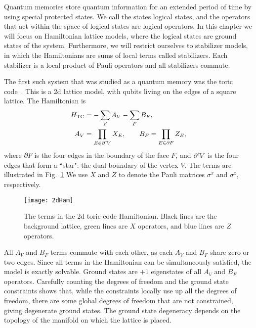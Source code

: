 Quantum memories store quantum information for an extended period of time by using special protected states. We call the states logical states, and the operators that act within the space of logical states are logical operators. 
In this chapter we will focus on Hamiltonian lattice models, where the logical states are ground states of the system. Furthermore, we will restrict ourselves to stabilizer models, in which the Hamiltonians are sums of local terms called stabilizers.
Each stabilizer is a local product of Pauli operators and all stabilizers commute. 

The first such system that was studied as a quantum memory was the toric code~\cite{Kitaev2003Fault}. This is a 2d lattice model, with qubits living on the edges of a square lattice. The Hamiltonian is 
\begin{align}
\begin{aligned}
H_\text{TC} &= -\sum_V A_V - \sum_F B_F,\\
A_V &= \prod_{E\in\partial^\dagger\! V} X_E,\qquad B_F = \prod_{E \in \partial F} Z_E, \label{eq:HTC}
\end{aligned}
\end{align}
where $\partial F$ is the four edges in the boundary of the face $F$, and $\partial^\dagger\! V$ is the four edges that form a ``star": the dual boundary of the vertex $V$. The terms are illustrated in Fig.~\ref{fig:2dHam}  We use $X$ and $Z$ to denote the Pauli matrices $\sigma^x$ and $\sigma^z$, respectively.

\begin{figure}
    \centering
    \texttt{[image: 2dHam]}
    \caption[The terms in the 2d toric code Hamiltonian]{The terms in the 2d toric code Hamiltonian. Black lines are the background lattice, green lines are $X$ operators, and blue lines are $Z$ operators.}
    \label{fig:2dHam}
\end{figure}

All $A_V$ and $B_F$ terms commute with each other, as each $A_V$ and $B_F$ share zero or two edges. Since all terms in the Hamiltonian can be simultaneously satisfied, the model is exactly solvable. Ground states are $+1$ eigenstates of all $A_V$ and $B_F$ operators. Carefully counting the degrees of freedom and the ground state constraints shows that, while the constraints locally use up all the degrees of freedom, there are some global degrees of freedom that are not constrained, giving degenerate ground states.
The ground state degeneracy depends on the topology of the manifold on which the lattice is placed. 

